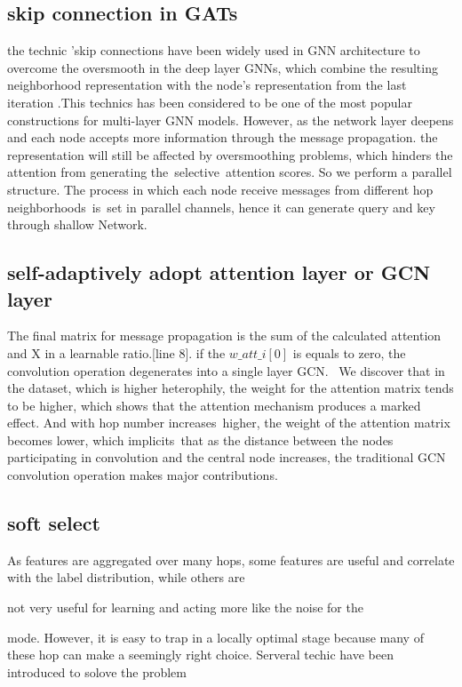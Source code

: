 \documentclass[letterpaper]{article} %
\begin{document}
\subsection{skip connection in GATs}
the technic 'skip connections have been widely used in GNN architecture to overcome the oversmooth in the deep layer GNNs, which combine the resulting neighborhood representation with the node's representation from the last iteration%
.This technics has been considered to be one of the most popular constructions for multi-layer GNN models. However, as the network layer deepens and each node accepts more information through the message propagation. the representation will still be affected by oversmoothing problems, which hinders the attention from generating the selective attention scores. So we perform a parallel structure. The process in which each node receive messages from different hop neighborhoods is set in parallel channels, hence it can generate query and key through shallow Network. 

\subsection{self-adaptively adopt attention layer or GCN layer}

The final matrix for message propagation is the sum of the calculated attention and X in a learnable ratio.[line 8]. if the $w\_att\_i[0]$ is equals to zero, the convolution operation degenerates into a single layer GCN.  We discover that in the dataset, which is higher heterophily, the weight for the attention matrix tends to be higher, which shows that the attention mechanism produces a marked effect. And with hop number increases higher, the weight of the attention matrix becomes lower, which implicits that as the distance between the nodes participating in convolution and the central node increases, the traditional GCN convolution operation makes major contributions.

\subsection{soft select}
As features are aggregated over many hops, some features are
useful and correlate with the label distribution, while others are

not very useful for learning and acting more like the noise for the

mode. However, it is easy to trap in a locally optimal stage because many of these hop can make a seemingly right choice. Serveral techic have been introduced to solove the problem%
\end{document}
